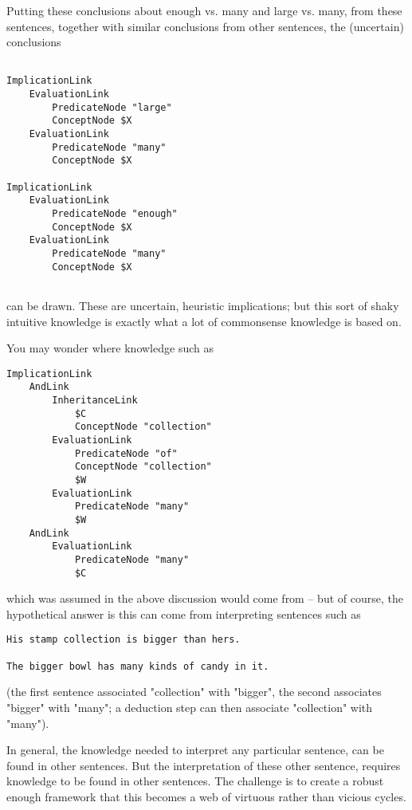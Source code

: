Putting these conclusions about enough vs. many and large vs. many, from these sentences, together with similar conclusions from other sentences, the (uncertain) conclusions

  {\tt\begin{small}\begin{lstlisting}

ImplicationLink
	EvaluationLink
		PredicateNode "large"
		ConceptNode $X
	EvaluationLink
		PredicateNode "many"
		ConceptNode $X
		
ImplicationLink
	EvaluationLink
		PredicateNode "enough"
		ConceptNode $X
	EvaluationLink
		PredicateNode "many"
		ConceptNode $X
			
\end{lstlisting}\end{small}}

\noindent can be drawn.   These are uncertain, heuristic implications; but this sort of shaky intuitive knowledge is exactly what a lot of commonsense knowledge is based on.

You may wonder where knowledge such as

{\tt\begin{small}\begin{lstlisting}
ImplicationLink
	AndLink
		InheritanceLink
			$C
			ConceptNode "collection"
		EvaluationLink
			PredicateNode "of"
			ConceptNode "collection"
			$W
		EvaluationLink
			PredicateNode "many"
			$W
	AndLink
		EvaluationLink
			PredicateNode "many"
			$C
 \end{lstlisting}\end{small}}

\noindent which was assumed in the above discussion would come from -- but of course, the hypothetical answer is this can come from interpreting sentences such as 

\begin{verbatim}
His stamp collection is bigger than hers.

The bigger bowl has many kinds of candy in it.
\end{verbatim}

\noindent (the first sentence associated "collection" with "bigger", the second associates "bigger" with "many"; a deduction step can then associate "collection" with "many").

\noindent In general, the knowledge needed to interpret any particular sentence, can be found in other sentences.   But the interpretation of these other sentence, requires knowledge to be found in other sentences.   The challenge is to create a robust enough framework that this becomes a web of virtuous rather than vicious cycles.

